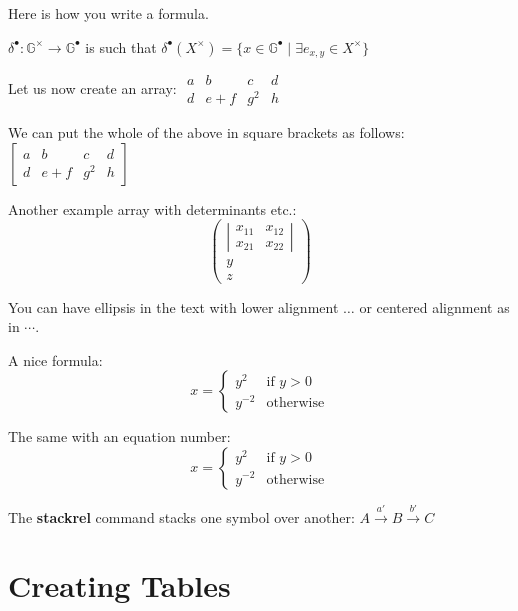 \documentclass[a4paper,10pt]{article}
\begin{document}
Here is how you write a formula.

$\delta^\bullet: \mathbb{G}^\times \rightarrow \mathbb{G}^\bullet $ is such 
that $\delta^\bullet(X^\times) = \{x \in \mathbb{G}^\bullet \mid 
\exists e_{x,y} \in X^\times\}$ \vspace{2mm}

Let us now create an array:
\( \begin{array}{cccc}
 a & b     & c & d \\
 d     & e+f  & g^2 & h
\end{array} \)

We can put the whole of the above in square brackets as follows:
\(\left[ \begin{array}{cccc}
 a & b     & c & d \\
 d     & e+f  & g^2 & h
\end{array} \right] \)

Another example array with determinants etc.:
\[ \left( \begin{array}{c}
           \left| \begin{array}{cc}
                   x_{11} & x_{12} \\
                   x_{21} & x_{22} 
                  \end{array}
	    \right| \\
	    y \\
	    z
          \end{array}
    \right)
\]

You can have ellipsis in the text with lower alignment $\ldots$ or centered 
alignment as in $\cdots$.

A nice formula:
\[
 x = 
\left\{ 
\begin{array}{ll}
 y^2 & \mbox{if $y > 0$} \\
 y^{-2} & \mbox{otherwise}
\end{array}
\right.
\]

The same with an equation number:
\begin{equation}
 x = 
\left\{ 
\begin{array}{ll}
 y^2 & \mbox{if $y > 0$} \\
 y^{-2} & \mbox{otherwise}
\end{array}
\right.
\end{equation}

The {\bf stackrel} command stacks one symbol over another:
\( A \stackrel{a'}{\rightarrow} B \stackrel{b'}{\rightarrow} C \)  

\section{Creating Tables}
\end{document}
